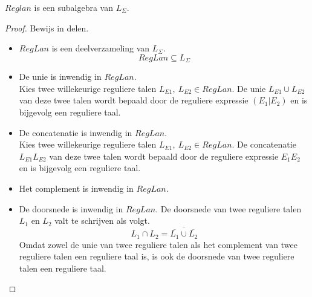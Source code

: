 \documentclass[main.tex]{subfiles}
\begin{document}
\begin{ei}
  $Reglan$ is een subalgebra van $L_{\Sigma}$.

  \begin{proof}
    Bewijs in delen.
    \begin{itemize}
    \item $RegLan$ is een deelverzameling van $L_{\Sigma}$.
      \[ RegLan \subseteq L_{\Sigma} \]
    \item De unie is inwendig in $RegLan$.\\
      Kies twee willekeurige reguliere talen $L_{E1},\ L_{E2} \in RegLan$.
      De unie $L_{E1} \cup L_{E2}$ van deze twee talen wordt bepaald door de reguliere expressie $(E_1|E_2)$ en is bijgevolg een reguliere taal.
    \item De concatenatie is inwendig in $RegLan$.\\
      Kies twee willekeurige reguliere talen $L_{E1},\ L_{E2} \in RegLan$.
      De concatenatie $L_{E1}L_{E2}$ van deze twee talen wordt bepaald door de reguliere expressie $E_1E_2$ en is bijgevolg een reguliere taal.
    \item Het complement is inwendig in $RegLan$.
    \item De doorsnede is inwendig in $RegLan$.
      De doorsnede van twee reguliere talen $L_{1}$ en $L_{2}$ valt te schrijven als volgt.
      \[ L_{1} \cap L_{2} = \overline{\overline{L_{1}} \cup \overline{L_{2}}} \]
      Omdat zowel de unie van twee reguliere talen als het complement van twee reguliere talen een  reguliere taal is, is ook de doorsnede van twee reguliere talen een reguliere taal.
    \end{itemize}
  \end{proof}
\end{ei}
\end{document}
